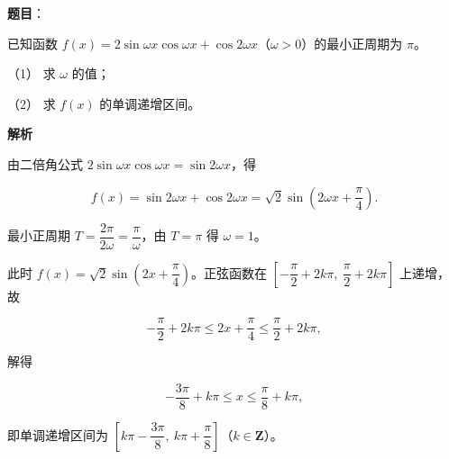 \begin{answer}

\textbf{题目}：

已知函数 \(f(x)=2\sin\omega x\cos\omega x+\cos 2\omega x\)（\(\omega>0\)）的最小正周期为 \(\pi\)。

（1） 求 \(\omega\) 的值；

（2） 求 \(f(x)\) 的单调递增区间。

\textbf{解析}


由二倍角公式 \(2\sin\omega x\cos\omega x=\sin 2\omega x\)，得

\nopagebreak[4]
\[
f(x)=\sin 2\omega x+\cos 2\omega x=\sqrt{2}\sin\left(2\omega x+\frac{\pi}{4}\right).
\]

最小正周期 \(T=\dfrac{2\pi}{2\omega}=\dfrac{\pi}{\omega}\)，由 \(T=\pi\) 得 \(\omega=1\)。


此时 \(f(x)=\sqrt{2}\sin\left(2x+\dfrac{\pi}{4}\right)\)。正弦函数在 \(\left[-\dfrac{\pi}{2}+2k\pi,\ \dfrac{\pi}{2}+2k\pi\right]\) 上递增，故

\nopagebreak[4]
\[
-\frac{\pi}{2}+2k\pi\leqslant2x+\frac{\pi}{4}\leqslant\frac{\pi}{2}+2k\pi,
\]

解得

\nopagebreak[4]
\[
-\frac{3\pi}{8}+k\pi\leqslant x\leqslant\frac{\pi}{8}+k\pi,
\]

即单调递增区间为 \(\left[k\pi-\dfrac{3\pi}{8},\ k\pi+\dfrac{\pi}{8}\right]\)（\(k\in\mathbf{Z}\)）。



\end{answer}
